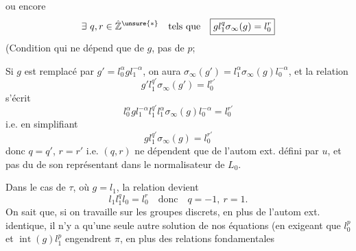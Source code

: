 ou encore
\[
\exists\ q,r\in\hat{\mathbb Z}^{\unsure{*}}\quad\text{tels que}\quad\boxed{gl_1^q\sigma_\infty(g)=l_0^r}
\]
(Condition qui ne dépend que de $g$, pas de $p$;

Si $g$ est remplacé par $g'=l_0^\alpha gl_1^{-\alpha}$, on aura $\sigma_\infty(g')=l_1^\alpha\sigma_\infty(g)l_0^{-\alpha}$, et la relation
\[
g'l_1^{q'}\sigma_\infty(g')=l_0^{r'}
\]
s'écrit
\[
l_0^\alpha gl_1^{-\alpha}l_1^{q'}l_1^\alpha\sigma_\infty(g)l_0^{-\alpha}=l_0^{r'}
\]
i.e. en simplifiant
\[
gl_1^{q'}\sigma_\infty(g)=l_0^{r'}
\]
donc $q=q'$, $r=r'$ i.e. $(q,r)$ ne dépendent que de l'autom ext. défini par $u$, et pas du  de son représentant dans le normalisateur de $L_0$.

Dans le cas de $\tau$, où $g=l_1$, la relation devient
\[
l_1l_1^ql_0=l_0^r\quad\text{donc}\quad q=-1,\ r=1.
\]
On sait que, si on travaille sur les groupes discrets, en plus de l'autom ext. identique, il n'y a qu'une seule autre solution de nos équations (en exigeant  que $l_0^p$ et $\operatorname{int}(g)l_1^p$ engendrent $\pi$, en plus des relations fondamentales
